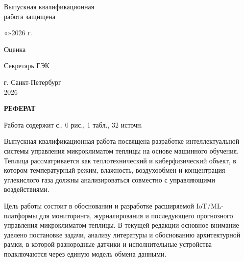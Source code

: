 \documentclass[a4paper,14pt]{extarticle}
\newcommand{\VkrStructuralSectionNoToc}[1]{%
  \begin{center}\bfseries #1\end{center}%
  \par\nopagebreak\vspace{12pt}%
}
\begin{document}
\begin{titlepage}
\vspace{0.4cm}

\begin{flushright}
\begin{minipage}{0.46\textwidth}
Выпускная квалификационная\\
работа защищена

\vspace{0.15cm}

«\underline{\hspace{0.8cm}}»\underline{\hspace{2.5cm}}2026 г.

\vspace{0.18cm}

Оценка

\vspace{0.12cm}

\underline{\hspace{3.0cm}}

\vspace{0.18cm}

Секретарь ГЭК \underline{\hspace{2.2cm}}
\end{minipage}
\end{flushright}

\vfill

\begin{center}
г. Санкт-Петербург\\
2026
\end{center}
\end{titlepage}

\setcounter{page}{2}
\hypersetup{pageanchor=true}

\VkrStructuralSectionNoToc{РЕФЕРАТ}\label{ux440ux435ux444ux435ux440ux430ux442}

Работа содержит \pageref{LastPage} с., 0 рис., 1 табл., 32 источн.

Выпускная квалификационная работа посвящена разработке интеллектуальной
системы управления микроклиматом теплицы на основе машинного обучения.
Теплица рассматривается как теплотехнический и киберфизический объект, в
котором температурный режим, влажность, воздухообмен и концентрация
углекислого газа должны анализироваться совместно с управляющими
воздействиями.

Цель работы состоит в обосновании и разработке расширяемой
IoT/ML-платформы для мониторинга, журналирования и последующего
прогнозного управления микроклиматом теплицы. В текущей редакции
основное внимание уделено постановке задачи, анализу литературы и
обоснованию архитектурной рамки, в которой разнородные датчики и
исполнительные устройства подключаются через единую модель обмена
данными.
\end{document}

